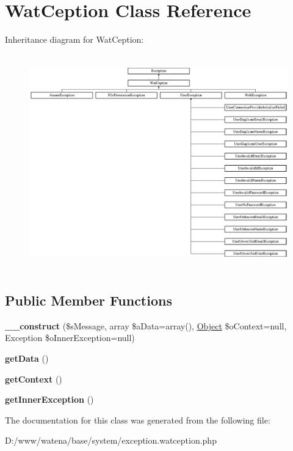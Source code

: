 \hypertarget{class_wat_ception}{\section{Wat\-Ception Class Reference}
\label{class_wat_ception}
}
Inheritance diagram for Wat\-Ception\-:\begin{figure}[H]
\begin{center}
\leavevmode
\includegraphics[height=9.372385cm]{class_wat_ception}
\end{center}
\end{figure}
\subsection*{Public Member Functions}
\begin{DoxyCompactItemize}
\item 
\hypertarget{class_wat_ception_ae8bfa3c8458e0df78996648c7e541b2f}{{\bfseries \-\_\-\-\_\-construct} (\$s\-Message, array \$a\-Data=array(), \hyperlink{class_object}{Object} \$o\-Context=null, Exception \$o\-Inner\-Exception=null)}\label{class_wat_ception_ae8bfa3c8458e0df78996648c7e541b2f}

\item 
\hypertarget{class_wat_ception_a5e9b352dedc46613e03d9afa02788ff7}{{\bfseries get\-Data} ()}\label{class_wat_ception_a5e9b352dedc46613e03d9afa02788ff7}

\item 
\hypertarget{class_wat_ception_a5b396784d046700e6d9be1a2539d7706}{{\bfseries get\-Context} ()}\label{class_wat_ception_a5b396784d046700e6d9be1a2539d7706}

\item 
\hypertarget{class_wat_ception_a152fba865ff88035dfb90d5b3b83621e}{{\bfseries get\-Inner\-Exception} ()}\label{class_wat_ception_a152fba865ff88035dfb90d5b3b83621e}

\end{DoxyCompactItemize}


The documentation for this class was generated from the following file\-:\begin{DoxyCompactItemize}
\item 
D\-:/www/watena/base/system/exception.\-watception.\-php\end{DoxyCompactItemize}
